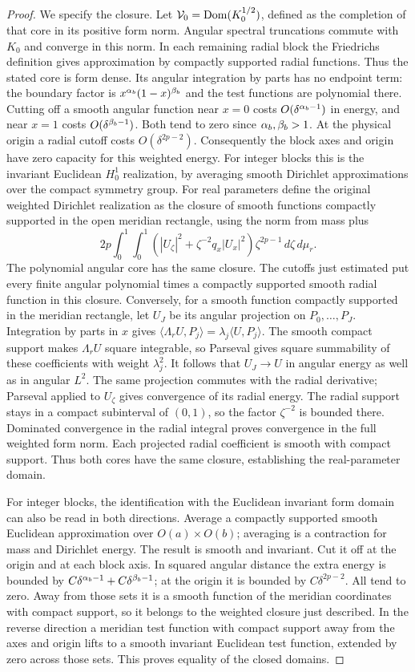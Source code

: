 \begin{proof}
We specify the closure. Let $\mathcal V_0=\operatorname{Dom}(K_0^{1/2})$, defined
as the completion of that core in its positive form norm.
Angular spectral truncations commute with $K_0$ and converge in
this norm. In each remaining radial block the Friedrichs definition
gives approximation by compactly supported radial functions.
Thus the stated core is form dense. Its angular integration by
parts has no endpoint term: the boundary factor is
$x^{\alpha_b}(1-x)^{\beta_b}$ and the test functions are polynomial there.
Cutting off a smooth angular function near $x=0$ costs
$O(\delta^{\alpha_b-1})$ in energy, and near $x=1$ costs
$O(\delta^{\beta_b-1})$. Both tend to zero since $\alpha_b,\beta_b>1$.
At the physical origin a radial cutoff costs $O(\delta^{2p-2})$.
Consequently the block axes and origin have zero capacity for
this weighted energy.
For integer blocks this is the invariant Euclidean $H^1_0$
realization, by averaging smooth Dirichlet approximations over the
compact symmetry group. For real parameters define the original weighted Dirichlet
realization as the closure of smooth functions compactly supported
in the open meridian rectangle, using the norm from mass plus
\[
 2p\int_0^1\!\int_0^1
 \left(|U_\zeta|^2+\zeta^{-2}q_x|U_x|^2\right)
                  \zeta^{2p-1}\,d\zeta\,d\mu_r.
\]
The polynomial angular core has the same closure. The cutoffs
just estimated put every finite angular
polynomial times a compactly supported smooth radial function
in this closure. Conversely, for a smooth function compactly
supported in the meridian rectangle, let $U_J$ be its angular
projection on $P_0,\ldots,P_J$.
Integration by parts in $x$ gives
$\langle\Lambda_r U,P_j\rangle=\lambda_j\langle U,P_j\rangle$.
The smooth compact support makes $\Lambda_rU$ square integrable,
so Parseval gives square summability of these coefficients with
weight $\lambda_j^2$. It follows that $U_J\to U$ in angular
energy as well as in angular $L^2$.
The same projection commutes with the radial derivative;
Parseval applied to $U_\zeta$ gives convergence of its radial
energy. The radial support stays in a compact subinterval of
$(0,1)$, so the factor $\zeta^{-2}$ is bounded there.
Dominated convergence in the radial integral proves convergence
in the full weighted form norm. Each projected radial coefficient
is smooth with compact support. Thus both cores have the same
closure, establishing the real-parameter domain.

For integer blocks, the identification with the Euclidean
invariant form domain can also be read in both directions.
Average a compactly supported smooth Euclidean approximation
over $O(a)\times O(b)$; averaging is a contraction for mass and
Dirichlet energy. The result is smooth and invariant.
Cut it off at the origin and at each block axis. In squared
angular distance the extra energy is bounded by
$C\delta^{\alpha_b-1}+C\delta^{\beta_b-1}$; at the origin it is bounded
by $C\delta^{2p-2}$. All tend to zero. Away from those sets it
is a smooth function of the meridian coordinates with compact
support, so it belongs to the weighted closure just described.
In the reverse direction a meridian test function with compact
support away from the axes and origin lifts to a smooth
invariant Euclidean test function, extended by zero across
those sets. This proves equality of the closed domains.


\end{proof}
